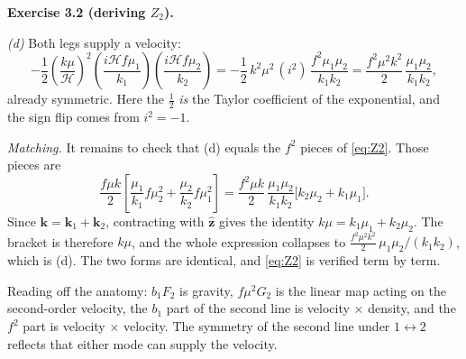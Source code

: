 \documentclass[a4paper,11pt]{article}
\newcommand{\vk}{\bm{k}}
\newcommand{\nhat}{\hat{\bm{z}}}
\def\cH{\mathcal{H}}
\newenvironment{solution}[1]
  {\par\medskip\noindent\textbf{#1}\par\nobreak\smallskip}
  {\par\medskip}
\begin{document}
\begin{solution}{Exercise 3.2 (deriving $Z_2$).}
\emph{(d)} Both legs supply a velocity:
\begin{equation*}
-\frac12\left(\frac{k\mu}{\cH}\right)^{\!2}
\left(\frac{i\cH f\mu_1}{k_1}\right)\!\left(\frac{i\cH f\mu_2}{k_2}\right)
= -\frac12\,k^2\mu^2\,(i^2)\,\frac{f^2\mu_1\mu_2}{k_1k_2}
= \frac{f^2\mu^2k^2}{2}\,\frac{\mu_1\mu_2}{k_1k_2} ,
\end{equation*}
already symmetric. Here the $\tfrac12$ \emph{is} the Taylor coefficient of the
exponential, and the sign flip comes from $i^2 = -1$.

\emph{Matching.} It remains to check that (d) equals the $f^2$ pieces of
\eqref{eq:Z2}. Those pieces are
\begin{equation*}
\frac{f\mu k}{2}\left[\frac{\mu_1}{k_1}f\mu_2^2
+ \frac{\mu_2}{k_2}f\mu_1^2\right]
= \frac{f^2\mu k}{2}\,\frac{\mu_1\mu_2}{k_1k_2}
\Big[k_2\mu_2 + k_1\mu_1\Big] .
\end{equation*}
Since $\vk = \vk_1+\vk_2$, contracting with $\nhat$ gives the identity
$k\mu = k_1\mu_1 + k_2\mu_2$. The bracket is therefore $k\mu$, and the whole
expression collapses to $\tfrac{f^2\mu^2k^2}{2}\,\mu_1\mu_2/(k_1k_2)$, which is
(d). The two forms are identical, and \eqref{eq:Z2} is verified term by term.

Reading off the anatomy: $b_1F_2$ is gravity, $f\mu^2G_2$ is the linear map
acting on the second-order velocity, the $b_1$ part of the second line is
velocity $\times$ density, and the $f^2$ part is velocity $\times$ velocity. The
symmetry of the second line under $1\leftrightarrow2$ reflects that either mode
can supply the velocity.
\end{solution}
\end{document}

